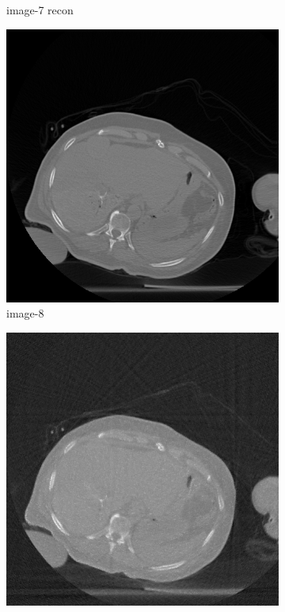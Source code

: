 \documentclass[journal]{IEEEtran}
\begin{document}
\begin{figure}[!h]
\begin{subfigure}[b]{0.24\linewidth}
\captionsetup{labelformat=empty}       
 \caption{image-7 recon}
    \end{subfigure}
 \begin{subfigure}[b]{0.24\linewidth}
        \includegraphics[width=\textwidth]{../images/tmh/RFA2/testIm.png}
\captionsetup{labelformat=empty}       
 \caption{image-8}
    \end{subfigure}
       \begin{subfigure}[b]{0.24\linewidth}
        \includegraphics[width=\textwidth]{../images/tmh/RFA2/new_protocol/weighted_pca_all_methods_kk_0_01.png}

\end{subfigure}
\end{figure}
\end{document}
